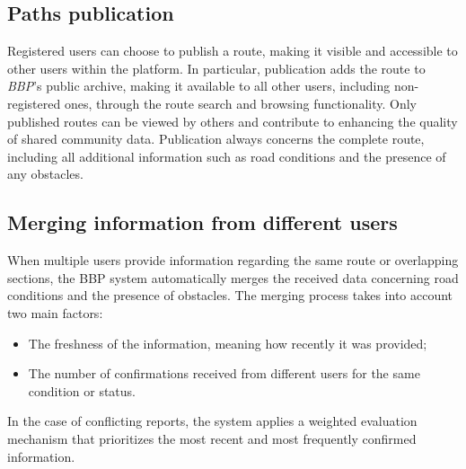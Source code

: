 \subsection*{Paths publication}
Registered users can choose to publish a route, making it visible and accessible to other users within the platform.
In particular, publication adds the route to \textit{BBP}’s public archive, making it available to all other users, including non-registered ones, through the route search and browsing functionality. Only published routes can be viewed by others and contribute to enhancing the quality of shared community data.
Publication always concerns the complete route, including all additional information such as road conditions and the presence of any obstacles.

\subsection*{Merging information from different users}
When multiple users provide information regarding the same route or overlapping sections, the BBP system automatically merges the received data concerning road conditions and the presence of obstacles. The merging process takes into account two main factors:
\begin{itemize}
    \item{The freshness of the information, meaning how recently it was provided;}
    \item {The number of confirmations received from different users for the same condition or status.}
\end{itemize}
In the case of conflicting reports, the system applies a weighted evaluation mechanism that prioritizes the most recent and most frequently confirmed information.

